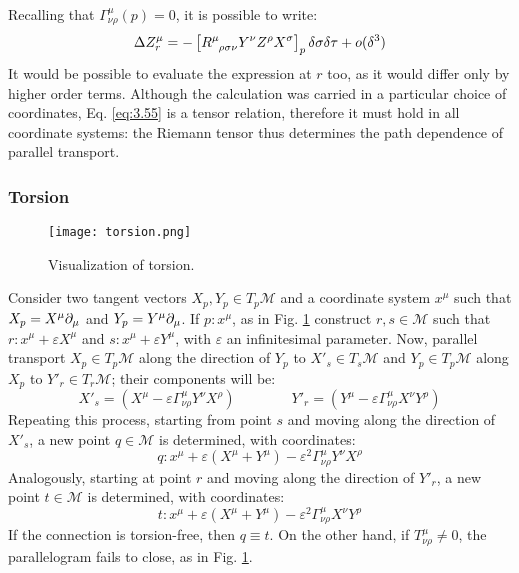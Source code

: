 Recalling that $ \Gamma^\mu_{\nu \rho}(p) = 0 $, it is possible to write:
\begin{equation}
  \Delta Z_r^\mu = - \left[ \tensor{R}{^\mu_{\rho \sigma \nu}} Y^\nu Z^\rho X^\sigma \right]_p \delta\sigma \delta\tau + o(\delta^3)
  \label{eq:3.55}
\end{equation}
It would be possible to evaluate the expression at $ r $ too, as it would differ only by higher order terms. Although the calculation was carried in a particular choice of coordinates, Eq. \ref{eq:3.55} is a tensor relation, therefore it must hold in all coordinate systems: the Riemann tensor thus determines the path dependence of parallel transport.

\subsubsection{Torsion}

\begin{figure}
  \centering
  \texttt{[image: torsion.png]}
  \caption{Visualization of torsion.}
  \label{torsion}
\end{figure}

Consider two tangent vectors $ X_p,Y_p \in T_p \mathcal{M} $ and a coordinate system $ x^\mu $ such that $ X_p = X^\mu \partial_\mu $ and $ Y_p = Y^\mu \partial_\mu $. If $ p : x^\mu $, as in Fig. \ref{torsion} construct $ r,s \in \mathcal{M} $ such that $ r : x^\mu + \varepsilon X^\mu $ and $ s : x^\mu + \varepsilon Y^\mu $, with $ \varepsilon $ an infinitesimal parameter. Now, parallel transport $ X_p \in T_p \mathcal{M} $ along the direction of $ Y_p $ to $ X'_s \in T_s \mathcal{M} $ and $ Y_p \in T_p \mathcal{M} $ along $ X_p $ to $ Y'_r \in T_r \mathcal{M} $; their components will be:
\begin{equation*}
  X'_s = \left( X^\mu - \varepsilon \Gamma^\mu_{\nu \rho} Y^\nu X^\rho \right)
  \qquad \qquad
  Y'_r = \left( Y^\mu - \varepsilon \Gamma^\mu_{\nu \rho} X^\nu Y^\rho \right)
\end{equation*}
Repeating this process, starting from point $ s $ and moving along the direction of $ X'_s $, a new point $ q \in \mathcal{M} $ is determined, with coordinates:
\begin{equation*}
  q : x^\mu + \varepsilon \left( X^\mu + Y^\mu \right) - \varepsilon^2 \Gamma^\mu_{\nu \rho} Y^\nu X^\rho
\end{equation*}
Analogously, starting at point $ r $ and moving along the direction of $ Y'_r $, a new point $ t \in \mathcal{M} $ is determined, with coordinates:
\begin{equation*}
  t : x^\mu + \varepsilon \left( X^\mu + Y^\mu \right) - \varepsilon^2 \Gamma^\mu_{\nu \rho} X^\nu Y^\rho
\end{equation*}
If the connection is torsion-free, then $ q \equiv t $. On the other hand, if $ T^\mu_{\nu \rho} \neq 0 $, the parallelogram fails to close, as in Fig. \ref{torsion}.

